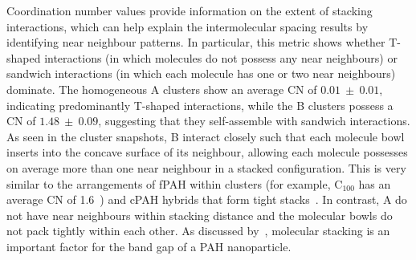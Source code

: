 Coordination number values provide information on the extent of stacking interactions, which can help explain the intermolecular spacing results by identifying near neighbour patterns. In particular, this metric shows whether T-shaped interactions (in which molecules do not possess any near neighbours) or sandwich interactions (in which each molecule has one or two near neighbours) dominate. The homogeneous A clusters show an average CN of $0.01~\pm~0.01$, indicating predominantly T-shaped interactions, while the B clusters possess a CN of $1.48~\pm~0.09$, suggesting that they self-assemble with sandwich interactions. As seen in the cluster snapshots, B interact closely such that each molecule bowl inserts into the concave surface of its neighbour, allowing each molecule possesses on average more than one near neighbour in a stacked configuration. This is very similar to the arrangements of fPAH within clusters (for example, $\text{C}_{\text{100}}$ has an average CN of 1.6~\cite{chen2014size}) and cPAH hybrids that form tight stacks~\cite{dubceac2018self}. In contrast, A do not have near neighbours within stacking distance and the molecular bowls do not pack tightly within each other. As discussed by~\citet{liu2019flame}, molecular stacking is an important factor for the band gap of a PAH nanoparticle.

